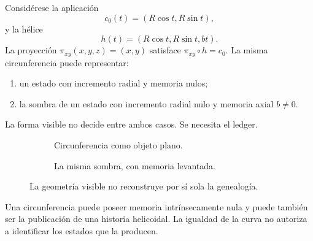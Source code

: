 Considérese la aplicación
\[
 c_0(t)=(R\cos t,R\sin t),
\]
y la hélice
\[
 h(t)=(R\cos t,R\sin t,bt).
\]
La proyección \(\pi_{xy}(x,y,z)=(x,y)\) satisface
\(\pi_{xy}\circ h=c_0\). La misma circunferencia puede representar:
\begin{enumerate}
\item un estado con incremento radial y memoria nulos;
\item la sombra de un estado con incremento radial nulo y memoria axial
\(b\neq0\).
\end{enumerate}
La forma visible no decide entre ambos casos. Se necesita el ledger.

\begin{figure}[htbp]
\centering
\begin{subfigure}[t]{.46\textwidth}
\centering
{}
\caption{Circunferencia como objeto plano.}
\end{subfigure}\hfill
\begin{subfigure}[t]{.46\textwidth}
\centering
{}
\caption{La misma sombra, con memoria levantada.}
\end{subfigure}
\caption{La geometría visible no reconstruye por sí sola la genealogía.}
\label{espiral:fig:circulo-helice}
\end{figure}

\begin{resultbox}[title={Defecto de fidelidad de la evaluación arquimediana sobre clases genealógicas}]
Una circunferencia puede poseer memoria intrínsecamente nula y puede también
ser la publicación de una historia helicoidal. La igualdad de la curva no
autoriza a identificar los estados que la producen.
\end{resultbox}


